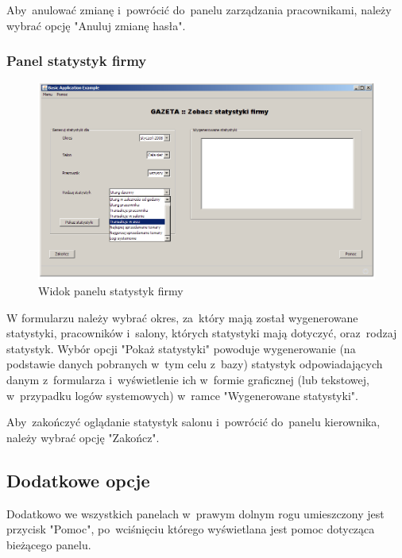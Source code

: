 Aby~anulować zmianę i~powrócić do~panelu zarządzania pracownikami, należy wybrać opcję "Anuluj zmianę hasła".
\clearpage
\subsubsection{Panel statystyk firmy}
\begin{figure}[h]
\begin{center}
\includegraphics[width=20cm,angle=90,keepaspectratio]{gfx/stat_firmy.png}
\end{center}
\caption{Widok panelu statystyk firmy}
\end{figure}
W formularzu należy wybrać okres, za~który mają został wygenerowane statystyki, pracowników i~salony, których statystyki mają dotyczyć, oraz~rodzaj statystyk. Wybór opcji "Pokaż statystyki" powoduje wygenerowanie (na podstawie danych pobranych w~tym celu z~bazy) statystyk odpowiadających danym z~formularza i~wyświetlenie ich w~formie graficznej (lub tekstowej, w~przypadku logów systemowych) w~ramce "Wygenerowane statystyki".

Aby~zakończyć oglądanie statystyk salonu i~powrócić do~panelu kierownika, należy wybrać opcję "Zakończ".
\clearpage
\subsection{Dodatkowe opcje}
Dodatkowo we wszystkich panelach w~prawym dolnym rogu umieszczony jest przycisk "Pomoc", po~wciśnięciu którego wyświetlana jest pomoc dotycząca bieżącego panelu.